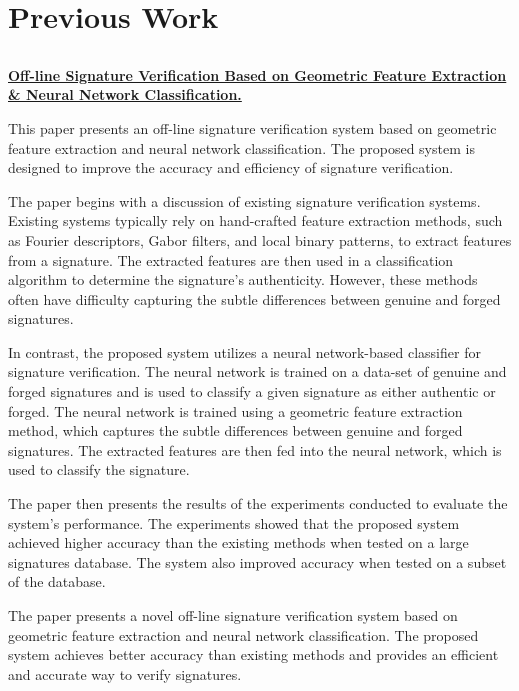\documentclass[conference]{IEEEtran}
\begin{document}
\section{Previous Work}

\subsection{}{\href{https://www.sciencedirect.com/science/article/abs/pii/S0031320396000635}{\textbf{\textbf{Off-line Signature Verification Based on Geometric Feature Extraction \& Neural Network Classification.}}}}

This paper presents an off-line signature verification system based on geometric feature extraction and neural network classification. The proposed system is designed to improve the accuracy and efficiency of signature verification. 

The paper begins with a discussion of existing signature verification systems. Existing systems typically rely on hand-crafted feature extraction methods, such as Fourier descriptors, Gabor filters, and local binary patterns, to extract features from a signature. The extracted features are then used in a classification algorithm to determine the signature's authenticity. However, these methods often have difficulty capturing the subtle differences between genuine and forged signatures.

In contrast, the proposed system utilizes a neural network-based classifier for signature verification. The neural network is trained on a data-set of genuine and forged signatures and is used to classify a given signature as either authentic or forged. The neural network is trained using a geometric feature extraction method, which captures the subtle differences between genuine and forged signatures. The extracted features are then fed into the neural network, which is used to classify the signature.

The paper then presents the results of the experiments conducted to evaluate the system's performance. The experiments showed that the proposed system achieved higher accuracy than the existing methods when tested on a large signatures database. The system also improved accuracy when tested on a subset of the database.

The paper presents a novel off-line signature verification system based on geometric feature extraction and neural network classification. The proposed system achieves better accuracy than existing methods and provides an efficient and accurate way to verify signatures.
\end{document}
